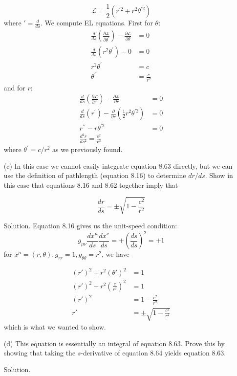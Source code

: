\documentclass[12pt]{article}
\begin{document}
\begin{enumerate}
  $$\mathcal{L}=\frac{1}{2}\left(r^{\prime 2}+r^2 \theta^{\prime 2}\right)$$
  where $'=\frac{d}{d s}$. We compute EL equations. First for $\theta$:
  $$
  \begin{aligned}
  \frac{d}{d s}\left(\frac{\partial \mathcal{L}}{\partial \theta^{\prime}}\right)-\frac{\partial \mathcal{L}}{\partial \theta}&=0\\
  \frac{d}{d s}\left(r^2 \theta^{\prime}\right)-0&=0\\
  r^2 \theta^{\prime}&=c\\
  \theta^{\prime}&=\frac{c}{r^2}
  \end{aligned}
  $$
  and for $r$:
  $$
  \begin{aligned}
  \frac{d}{d s}\left(\frac{\partial \mathcal{L}}{\partial r^{\prime}}\right)-\frac{\partial \mathcal{L}}{\partial r}&=0\\
  \frac{d}{d s}\left(r^{\prime}\right)-\frac{\partial}{\partial r}\left(\frac{1}{2} r^2 \theta^{\prime 2}\right)&=0\\
  r^{\prime \prime}-r \theta^{\prime 2}&=0\\
  \frac{d^2 r}{d s^2}=\frac{c^2}{r^3}
  \end{aligned}
  $$
  where $\theta^{\prime}=c / r^2$ as we previously found.


  \item[(c)] In this case we cannot easily integrate equation 8.63 directly, but we can use the definition of pathlength (equation 8.16) to determine $d r / d s$. Show in this case that equations 8.16 and 8.62 together imply that

  $$
  \frac{d r}{d s}= \pm \sqrt{1-\frac{c^2}{r^2}}
  $$

  \item[Solution.]
  Equation 8.16 gives us the unit-speed condition:
  $$g_{\mu \nu} \frac{d x^\mu}{d s} \frac{d x^\nu}{d s}=+\left(\frac{d s}{d s}\right)^2=+1$$
  for $x^\mu=(r, \theta), g_{r r}=1, g_{\theta \theta}=r^2$, we have


  $$
  \begin{aligned}
   (r')^2+r^2(\theta')^2&=1 \\
  (r')^2+r^2\left(\frac{c}{r^2}\right)^2&=1 \\
  (r')^2&=1-\frac{c^2}{r^2} \\
  r'&= \pm \sqrt{1-\frac{c^2}{r^2}}
  \end{aligned}
  $$
  which is what we wanted to show.


  \item[(d)] This equation is essentially an integral of equation 8.63. Prove this by showing that taking the $s$-derivative of equation 8.64 yields equation 8.63.
  \item[Solution.] 
  

\end{enumerate}
\end{document}
